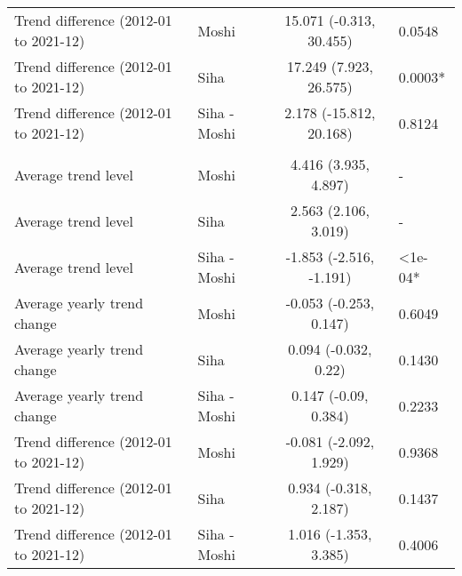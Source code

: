 \begin{longtable}{l|lcl}
Trend difference (2012-01 to 2021-12) & Moshi & 15.071 (-0.313, 30.455) & 0.0548 \\ 
Trend difference (2012-01 to 2021-12) & Siha & 17.249 (7.923, 26.575) & 0.0003* \\ 
Trend difference (2012-01 to 2021-12) & Siha - Moshi & 2.178 (-15.812, 20.168) & 0.8124 \\ 
\midrule\addlinespace[2.5pt]
\multicolumn{4}{l}{No. rain days } \\ 
\midrule\addlinespace[2.5pt]
Average trend level & Moshi & 4.416 (3.935, 4.897) & - \\ 
Average trend level & Siha & 2.563 (2.106, 3.019) & - \\ 
Average trend level & Siha - Moshi & -1.853 (-2.516, -1.191) & <1e-04* \\ 
Average yearly trend change & Moshi & -0.053 (-0.253, 0.147) & 0.6049 \\ 
Average yearly trend change & Siha & 0.094 (-0.032, 0.22) & 0.1430 \\ 
Average yearly trend change & Siha - Moshi & 0.147 (-0.09, 0.384) & 0.2233 \\ 
Trend difference (2012-01 to 2021-12) & Moshi & -0.081 (-2.092, 1.929) & 0.9368 \\ 
Trend difference (2012-01 to 2021-12) & Siha & 0.934 (-0.318, 2.187) & 0.1437 \\ 
Trend difference (2012-01 to 2021-12) & Siha - Moshi & 1.016 (-1.353, 3.385) & 0.4006 \\ 
\bottomrule
\end{longtable}

